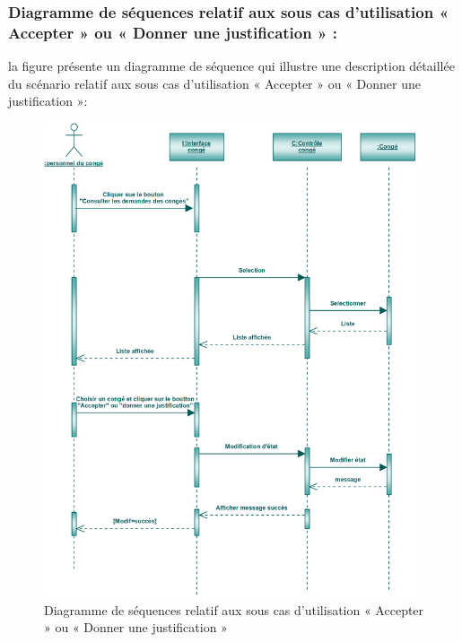 \documentclass[12 pt ]{report}
\begin{document}
\subsubsection{Diagramme de séquences relatif aux sous cas d’utilisation   « Accepter » ou « Donner une justification » :}
la figure   présente un diagramme de séquence qui illustre une description détaillée du scénario relatif aux sous cas d’utilisation   « Accepter » ou « Donner une justification »: 
\begin{figure}[h]
 \begin{center}
\includegraphics[width= 15 cm ,height=  14cm]{sec_mod_eta.PNG}
\caption{Diagramme de séquences relatif aux sous cas d’utilisation   « Accepter » ou « Donner une justification »}

\end{center}
\end{figure}
\newpage
\end{document}
